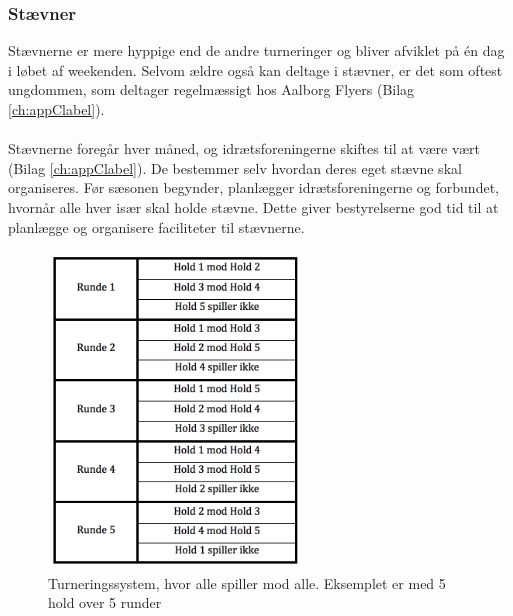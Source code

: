 \subsubsection{Stævner}\label{staevner}
Stævnerne er mere hyppige end de andre turneringer og bliver afviklet på én dag i løbet af weekenden. Selvom ældre også kan deltage i stævner, er det som oftest ungdommen, som deltager regelmæssigt hos Aalborg Flyers (Bilag \ref{ch:appClabel}).
\\\\
Stævnerne foregår hver måned, og idrætsforeningerne skiftes til at være vært (Bilag \ref{ch:appClabel}). De bestemmer selv hvordan deres eget stævne skal organiseres. Før sæsonen begynder, planlægger idrætsforeningerne og forbundet, hvornår alle hver især skal holde stævne. Dette giver bestyrelserne god tid til at planlægge og organisere faciliteter til stævnerne. 
\\
\begin{figure}[H]
  \centering
  \includegraphics[width=0.6\textwidth]{figures/RoundRobin.png}
  \caption{Turneringssystem, hvor alle spiller mod alle. Eksemplet er med 5 hold over 5 runder}
  \label{fig:RoundRobin}
\end{figure}

